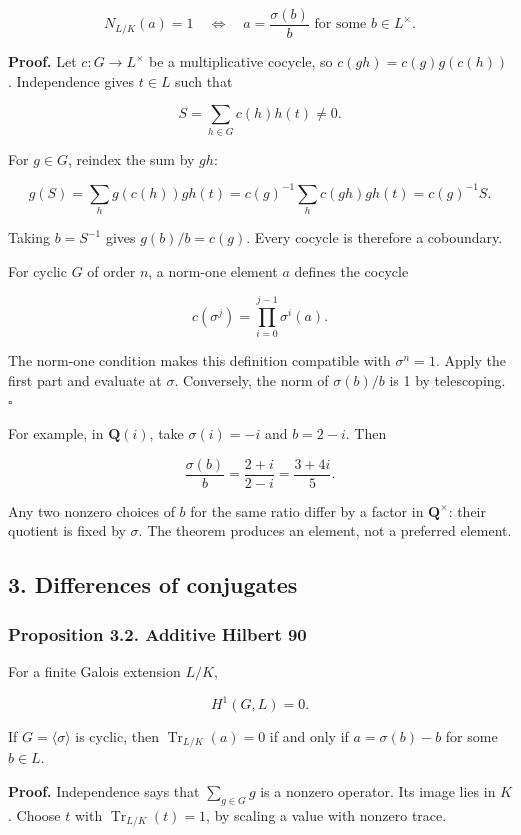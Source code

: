 \documentclass[11pt,a4paper]{article}
\begin{document}
\[
N_{L/K}(a)=1
\quad\Longleftrightarrow\quad
a=\frac{\sigma(b)}b\text{ for some }b\in L^\times.
\]

\textbf{Proof.} Let \(c:G\to L^\times\) be a multiplicative cocycle, so
\(c(gh)=c(g)g(c(h))\). Independence gives \(t\in L\) such that

\[
S=\sum_{h\in G}c(h)h(t)\ne0.
\]

For \(g\in G\), reindex the sum by \(gh\):

\[
g(S)=\sum_h g(c(h))gh(t)
=c(g)^{-1}\sum_h c(gh)gh(t)
=c(g)^{-1}S.
\]

Taking \(b=S^{-1}\) gives \(g(b)/b=c(g)\). Every cocycle is therefore a
coboundary.

For cyclic \(G\) of order \(n\), a norm-one element \(a\) defines the
cocycle

\[
c(\sigma^j)=\prod_{i=0}^{j-1}\sigma^i(a).
\]

The norm-one condition makes this definition compatible with
\(\sigma^n=1\). Apply the first part and evaluate at \(\sigma\).
Conversely, the norm of \(\sigma(b)/b\) is 1 by telescoping. \(\square\)

For example, in \(\mathbf Q(i)\), take \(\sigma(i)=-i\) and \(b=2-i\).
Then

\[
\frac{\sigma(b)}b=\frac{2+i}{2-i}=\frac{3+4i}{5}.
\]

Any two nonzero choices of \(b\) for the same ratio differ by a factor
in \(\mathbf Q^\times\): their quotient is fixed by \(\sigma\). The
theorem produces an element, not a preferred element.

\subsection{3. Differences of
conjugates}\label{differences-of-conjugates}

\subsubsection{Proposition 3.2. Additive Hilbert
90}\label{proposition-3.2.-additive-hilbert-90}

For a finite Galois extension \(L/K\),

\[
H^1(G,L)=0.
\]

If \(G=\langle\sigma\rangle\) is cyclic, then
\(\operatorname{Tr}_{L/K}(a)=0\) if and only if \(a=\sigma(b)-b\) for
some \(b\in L\).

\textbf{Proof.} Independence says that \(\sum_{g\in G}g\) is a nonzero
operator. Its image lies in \(K\). Choose \(t\) with
\(\operatorname{Tr}_{L/K}(t)=1\), by scaling a value with nonzero trace.
\end{document}
